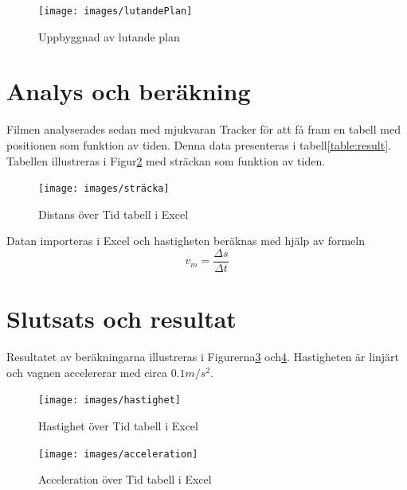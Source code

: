 \documentclass[11p, titlepage, oneside, a4paper]{article}
\begin{document}
        \begin{figure}[!h]
            \centering
            \texttt{[image: images/lutandePlan]}
            \caption{Uppbyggnad av lutande plan}
            \label{fig:lutandeplan}
        \end{figure}

	\section{Analys och beräkning}
    Filmen analyserades sedan med mjukvaran Tracker för att få fram en tabell med positionen som funktion av
    tiden.
    Denna data presenteras i tabell\ref{table:result}.
    Tabellen illustreras i Figur\ref{fig:stracka} med sträckan som funktion av tiden.

    \begin{figure}[!h]
        \centering
        \texttt{[image: images/sträcka]}
        \caption{Distans över Tid tabell i Excel}
        \label{fig:stracka}
    \end{figure}
        

    Datan importeras i Excel och hastigheten beräknas med hjälp av formeln
    \begin{equation}
        v_m = \frac{\Delta s}{\Delta t}
    \label{eq:medelhastighet}
    \end{equation}
    
    \section{Slutsats och resultat} 
        Resultatet av beräkningarna illustreras i Figurerna\ref{fig:hastighet} och\ref{fig:acceleration}.
Hastigheten är linjärt och vagnen accelererar med circa $0.1m/s^2$.

        \begin{figure}[!h]
            \centering
            \texttt{[image: images/hastighet]}
            \caption{Hastighet över Tid tabell i Excel}
            \label{fig:hastighet}
        \end{figure}

        \begin{figure}[!h]
            \centering
            \texttt{[image: images/acceleration]}
            \caption{Acceleration över Tid tabell i Excel}
            \label{fig:acceleration}
        \end{figure}
\end{document}
